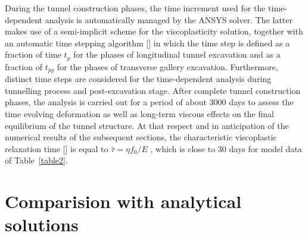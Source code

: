 \documentclass[a4paper,fleqn]{cas-sc}
\begin{document}
\FloatBarrier
During the tunnel construction phases, the time increment used for the time-dependent analysis is automatically managed by the ANSYS solver. The latter makes use of a semi-implicit scheme for the viscoplasticity solution, together with an automatic time stepping algorithm [] in which the time step is defined as a fraction of time $t_p$ for the phases of longitudinal tunnel excavation and as a fraction of $t_{pg}$ for the phases of transverse gallery excavation. Furthermore, distinct time steps are considered for the time-dependent analysis during tunnelling process and post-excavation stage. After complete tunnel construction phases, the analysis is carried out for a period of about $3000$ days to assess the time evolving deformation as well as long-term viscous effects on the final equilibrium of the tunnel structure. At that respect and in anticipation of the numerical results of the subsequent sections, the characteristic viscoplastic relaxation time [] is equal to $\bar{\tau} = \eta f_0 / E$ , which is close to $30$ days for model data of Table~\ref{table2}.

\section{Comparision with analytical solutions}\label{}
\end{document}

